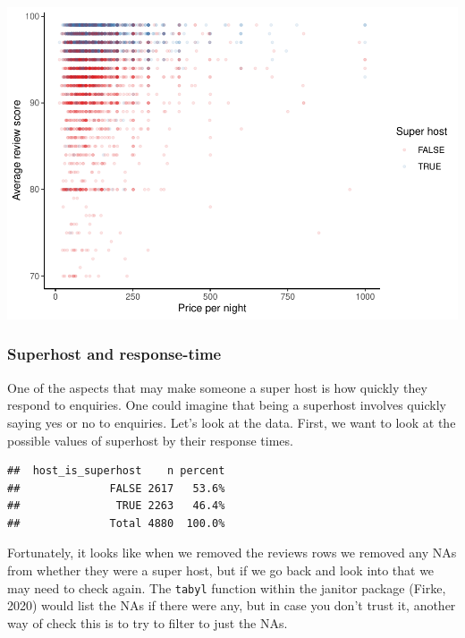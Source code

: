 \documentclass[
]{book}
\newenvironment{Shaded}{\begin{snugshade}}{\end{snugshade}}
\newcommand{\KeywordTok}[1]{\textcolor[rgb]{0.13,0.29,0.53}{\textbf{#1}}}
\newcommand{\NormalTok}[1]{#1}
\newcommand{\OperatorTok}[1]{\textcolor[rgb]{0.81,0.36,0.00}{\textbf{#1}}}
\newcommand{\StringTok}[1]{\textcolor[rgb]{0.31,0.60,0.02}{#1}}
\begin{document}
\includegraphics{telling_stories_with_data_files/figure-latex/unnamed-chunk-331-1.pdf}

\hypertarget{superhost-and-response-time}{%
\subsubsection{Superhost and response-time}\label{superhost-and-response-time}}

One of the aspects that may make someone a super host is how quickly they respond to enquiries. One could imagine that being a superhost involves quickly saying yes or no to enquiries. Let's look at the data. First, we want to look at the possible values of superhost by their response times.

\begin{Shaded}
\end{Shaded}

\begin{verbatim}
##  host_is_superhost    n percent
##              FALSE 2617   53.6%
##               TRUE 2263   46.4%
##              Total 4880  100.0%
\end{verbatim}

Fortunately, it looks like when we removed the reviews rows we removed any NAs from whether they were a super host, but if we go back and look into that we may need to check again. The \texttt{tabyl} function within the janitor package (Firke, 2020) would list the NAs if there were any, but in case you don't trust it, another way of check this is to try to filter to just the NAs.
\end{document}
